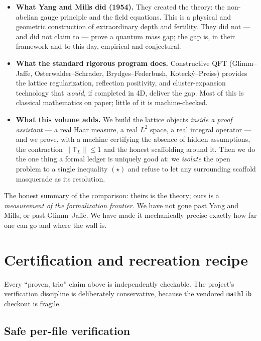 \documentclass[11pt]{article}
\newcommand{\TL}{\mathsf{T}_L}
\newcommand{\code}[1]{\texttt{#1}}
\begin{document}
\begin{itemize}
  \item \textbf{What Yang and Mills did (1954).} They created the
        theory: the non-abelian gauge principle and the field
        equations. This is a physical and geometric construction of
        extraordinary depth and fertility. They did not --- and did
        not claim to --- prove a quantum mass gap; the gap is, in
        their framework and to this day, empirical and conjectural.
  \item \textbf{What the standard rigorous program does.} Constructive
        QFT (Glimm--Jaffe, Osterwalder--Schrader, Brydges--Federbush,
        Koteck\'y--Preiss) provides the lattice regularization,
        reflection positivity, and cluster-expansion technology that
        \emph{would}, if completed in 4D, deliver the gap. Most of
        this is classical mathematics on paper; little of it is
        machine-checked.
  \item \textbf{What this volume adds.} We build the lattice objects
        \emph{inside a proof assistant} --- a real Haar measure, a
        real $L^2$ space, a real integral operator --- and we prove,
        with a machine certifying the absence of hidden assumptions,
        the contraction $\lVert\TL\rVert\le 1$ and the honest
        scaffolding around it. Then we do the one thing a formal
        ledger is uniquely good at: we \emph{isolate} the open
        problem to a single inequality $(\star)$ and refuse to let
        any surrounding scaffold masquerade as its resolution.
\end{itemize}

The honest summary of the comparison: theirs is the theory; ours is a
\emph{measurement of the formalization frontier}. We have not gone
past Yang and Mills, or past Glimm--Jaffe. We have made it
mechanically precise exactly how far one can go and where the wall
is.

\section{Certification and recreation recipe}

Every ``proven, trio'' claim above is independently checkable. The
project's verification discipline is deliberately conservative,
because the vendored \code{mathlib} checkout is fragile.

\subsection{Safe per-file verification}
\end{document}
